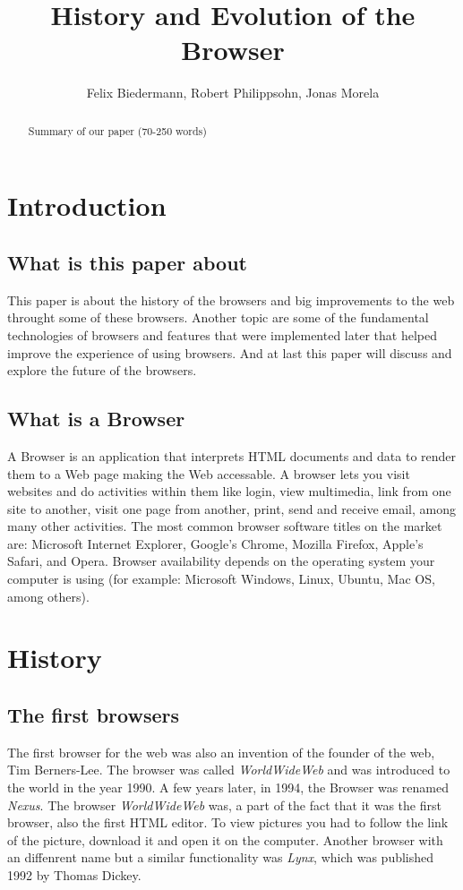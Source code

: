 \documentclass[runningheads]{llncs}
\title{History and Evolution of the Browser}
\author{Felix Biedermann, Robert Philippsohn, Jonas Morela}
\institute{University of Stuttgart, Institute for Architecture of Application Systems \\
Universitätsstraße 38, 70569 Stuttgart, Germany}
\begin{document}
\raggedbottom
\maketitle

	\begin{abstract}
		Summary of our paper (70-250 words)
	\end{abstract}

	\section{Introduction}
		\subsection{What is this paper about}
		This paper is about the history of the browsers and big improvements to the web throught some of these browsers. Another topic are some of the fundamental technologies of browsers and features that were implemented later that helped improve the experience of using browsers. And at last this paper will discuss and explore the future of the browsers.
		\subsection{What is a Browser}
		A Browser is an application that interprets HTML documents and data to render them to a Web page making the Web accessable. A browser lets you visit websites and do activities within them like login, view multimedia, link from one site to another, visit one page from another, print, send and receive email, among many other activities. The most common browser software titles on the market are: Microsoft Internet Explorer, Google's Chrome, Mozilla Firefox, Apple's Safari, and Opera. Browser availability depends on the operating system your computer is using (for example: Microsoft Windows, Linux, Ubuntu, Mac OS, among others).

	\section{History}
		\subsection{The first browsers}
		The first browser for the web was also an invention of the founder of the web, Tim Berners-Lee. The browser was called \textit{WorldWideWeb} and was introduced to the world in the year 1990. A few years later, in 1994, the Browser was renamed \textit{Nexus}. The browser \textit{WorldWideWeb} was, a part of the fact that it was the first browser, also the first HTML editor.
		To view pictures you had to follow the link of the picture, download it and open it on the computer. Another browser with an diffenrent name but a similar functionality was \textit{Lynx}, which was published 1992 by Thomas Dickey.
\end{document}
